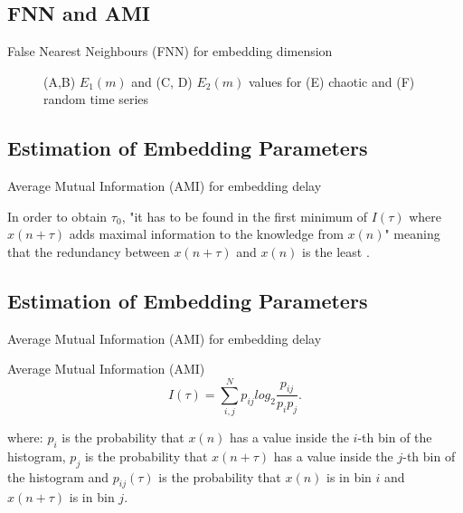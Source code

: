 \subsection{FNN and AMI}
{

\begin{frame}{False Nearest Neighbours (FNN) for embedding dimension}
    \begin{figure}
        \centering
	\caption{(A,B) $E_1(m)$ and (C, D) $E_2(m)$ values for (E) chaotic 
		and (F) random time series} 
   \end{figure}
	
\end{frame}
}




\subsection{Estimation of Embedding Parameters}
{

\begin{frame}{Average Mutual Information (AMI) for embedding delay}

In order to obtain $\tau_0$, 
"it has to be found in the first minimum of $I(\tau)$ where $x(n+\tau)$ 
adds maximal information to the knowledge from $x(n)$" meaning that the 
redundancy between $x(n+\tau)$ and $x(n)$ is the least .


\end{frame}
}





\subsection{Estimation of Embedding Parameters}
{

\begin{frame}{Average Mutual Information (AMI) for embedding delay}

\begin{block}{Average Mutual Information (AMI)}
\begin{equation*}
I(\tau) = \sum_{i,j}^N p_{ij} log_2 \frac{ p_{ij} }{ p_i p_j }.
\end{equation*}
\end{block}

where: 
$p_i$ is the probability that $x(n)$ has a value inside the $i$-th bin of 
the histogram, $p_j$ is the probability that $x(n+\tau)$ has a value inside 
the $j$-th bin of the histogram and $p_{ij}(\tau)$ is the probability 
that $x(n)$ is in bin $i$ and $x(n+\tau)$ is in bin $j$.

\end{frame}
}



